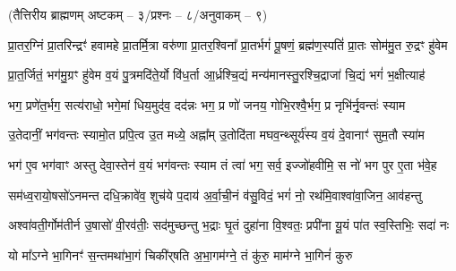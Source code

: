 

\vspace{-1ex}
\centerline{\normalsize(तैत्तिरीय ब्राह्मणम् अष्टकम् – ३/प्रश्नः – ८/अनुवाकम् – ९)}


\twolineshloka
{प्रा॒तर॒ग्निं प्रा॒तरिन्द्रꣳ॑ हवामहे प्रा॒तर्मि॒त्रा वरु॑णा प्रा॒तर॒श्विना᳚}
{प्रा॒तर्भगं॑ पू॒षणं॒ ब्रह्म॑ण॒स्पतिं॑ प्रा॒तः सोम॑मु॒त रु॒द्रꣳ हु॑वेम}

\twolineshloka
{प्रा॒त॒र्जितं॒ भग॑मु॒ग्रꣳ हु॑वेम व॒यं पु॒त्रमदि॑ते॒र्यो वि॑ध॒र्ता}
{आ॒र्ध्रश्चि॒द्यं मन्य॑मानस्तु॒रश्चि॒द्राजा॑ चि॒द्यं भगं॑ भ॒क्षीत्याह॑}

\twolineshloka
{भग॒ प्रणे॑त॒र्भग॒ सत्य॑राधो॒ भगे॒मां धिय॒मुद॑व॒ दद॑न्नः}
{भग॒ प्र णो॑ जनय॒ गोभि॒रश्वै॒र्भग॒ प्र नृभि॑र्नृ॒वन्तः॑ स्याम}

\twolineshloka
{उ॒तेदानीं॒ भग॑वन्तः स्यामो॒त प्रपि॒त्व उ॒त मध्ये॒ अह्ना᳚म्}
{उ॒तोदि॑ता मघव॒न्थ्सूर्य॑स्य व॒यं दे॒वानाꣳ॑ सुम॒तौ स्या॑म}

\twolineshloka
{भग॑ ए॒व भग॑वाꣳ अस्तु देवा॒स्तेन॑ व॒यं भग॑वन्तः स्याम}
{तं त्वा॑ भग॒ सर्व॒ इज्जो॑हवीमि॒ स नो॑ भग पुर ए॒ता भ॑वे॒ह}

\twolineshloka
{सम॑ध्व॒रायो॒षसो॑ऽनमन्त दधि॒क्रावे॑व॒ शुच॑ये प॒दाय॑}
{अ॒र्वा॒ची॒नं व॑सु॒विदं॒ भगं॑ नो॒ रथ॑मि॒वाश्वा॑वा॒जिन॒ आव॑हन्तु}

\twolineshloka
{अश्वा॑वती॒र्गोम॑तीर्न उ॒षासो॑ वी॒रव॑तीः॒ सद॑मुच्छन्तु भ॒द्राः}
{घृ॒तं दुहा॑ना वि॒श्वतः॒ प्रपी॑ना यू॒यं पा॑त स्व॒स्तिभिः॒ सदा॑ नः}

\twolineshloka
{यो मा᳚ऽग्ने भा॒गिनꣳ॑ स॒न्तमथा॑भा॒गं चिकी॑र्‌षति}
{अ॒भा॒गम॑ग्ने॒ तं कु॑रु॒ माम॑ग्ने भा॒गिनं॑ कुरु}


